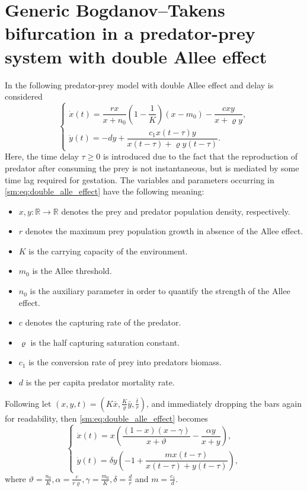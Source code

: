 \section[Predator-prey system with double Allee effect]
        {Generic Bogdanov--Takens bifurcation in a predator-prey system with double Allee effect}
In \cite{Jiao2021} the following predator-prey model with double Allee effect
and delay is considered
\begin{equation}
\label{sm:eq:double_alle_effect}
\begin{cases}
    \dot x(t) = \dfrac{rx}{x+n_0}\left(1-\dfrac1 K\right)\left(x - m_0\right) - \dfrac{cxy}{x+\varrho y},\\
    \dot y(t) = -dy + \dfrac{c_1 x(t-\tau)y}{x(t-\tau) + \varrho y(t-\tau)}.
\end{cases}
\end{equation}
Here, the time delay $\tau \geq 0$ is introduced due to the fact that the
reproduction of predator after consuming the prey is not instantaneous, but is
mediated by some time lag required for gestation.
The variables and parameters occurring in \cref{sm:eq:double_alle_effect}
have the following meaning:
\begin{itemize}
\item $x,y\colon \mathbb R \rightarrow \mathbb R$ denotes the prey and predator population density, respectively.
\item $r$ denotes the maximum prey population growth in absence of the Allee effect.
\item $K$ is the carrying capacity of the environment.
\item $m_0$ is the Allee threshold.
\item $n_0$ is the auxiliary parameter in order to quantify the strength of the Allee effect.
\item $c$ denotes the capturing rate of the predator.
\item $\varrho$ is the half capturing saturation constant.
\item $c_1$ is the conversion rate of prey into predators biomass.
\item $d$ is the per capita predator mortality rate.
\end{itemize}
Following \cite{Jiao2021} let $(x,y,t) = \left(K\bar x, \frac K \varrho \bar y, \frac{\bar t}r\right)$, and immediately 
dropping the bars again for readability, then \cref{sm:eq:double_alle_effect} becomes
\begin{equation}
\label{sm:eq:double_alle_effect_rescaled}
\begin{cases}
    \dot x(t) = x \left( \dfrac{(1-x)(x-\gamma)}{x+\vartheta} - \dfrac{\alpha y}{x+y} \right), \\
    \dot y(t) = \delta y \left( -1 + \dfrac{ m x(t-\tau) }{ x(t-\tau) + y(t-\tau) }\right),
\end{cases}
\end{equation}
where $\vartheta = \frac{n_0}K, \alpha=\frac c{r\varrho}, \gamma = \frac{m_0}K, \delta = \frac dr$ and $m=\frac{c_1}d$.


